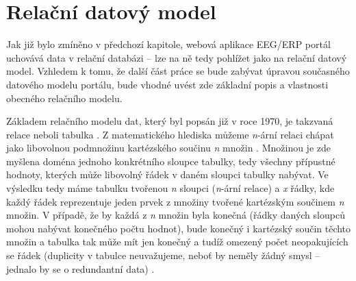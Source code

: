 \documentclass{projekt}
\begin{document}
\chapter{Relační datový model}
\hspace{0.65cm}Jak již bylo zmíněno v předchozí kapitole, webová aplikace EEG/ERP portál uchovává data v relační databázi – lze na ně tedy pohlížet jako na relační datový model. Vzhledem k tomu, že další část práce se bude zabývat úpravou současného datového modelu portálu, bude vhodné uvést zde základní popis a vlastnosti obecného relačního modelu.

Základem relačního modelu dat, který byl popsán již v roce 1970, je takzvaná relace neboli tabulka \cite{_17}. Z matematického hlediska můžeme {\it n}-ární relaci chápat jako libovolnou podmnožinu kartézského součinu {\it n} množin \cite{_18}. Množinou je zde myšlena doména jednoho konkrétního sloupce tabulky, tedy všechny přípustné hodnoty, kterých může libovolný řádek v daném sloupci tabulky nabývat. Ve výsledku tedy máme tabulku tvořenou {\it n} sloupci ({\it n}-ární relace) a {\it x} řádky, kde každý řádek reprezentuje jeden prvek z množiny tvořené kartézským součinem {\it n} množin. V případě, že by každá z {\it n} množin byla konečná (řádky daných sloupců mohou nabývat konečného počtu hodnot), bude konečný i kartézský součin těchto množin a tabulka tak může mít jen konečný a tudíž omezený počet neopakujících se řádek (duplicity v tabulce neuvažujeme, neboť by neměly žádný smysl – jednalo by se o redundantní data) \cite{_18}.
\end{document}
